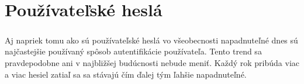 \chapter{Používateľské heslá}

\paragraph{}
Aj napriek tomu ako sú používateľské heslá vo všeobecnosti napadnuteľné dnes sú najčastejšie používaný spôsob autentifikácie používateľa. Tento trend sa pravdepodobne ani v najbližšej budúcnosti nebude meniť. Každý rok pribúda viac a viac hesiel zatiaľ sa sa stávajú čím ďalej tým ľahšie napadnuteľné.


